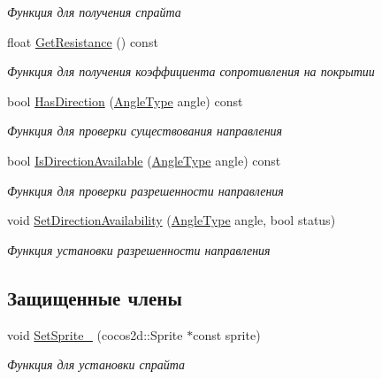 \begin{DoxyCompactItemize}
\begin{DoxyCompactList}\small\item\em Функция для получения спрайта \end{DoxyCompactList}\item 
float \hyperlink{classrtm_1_1_coating_object_a1680b004da834a1b885b4e22f09e84cc}{Get\+Resistance} () const
\begin{DoxyCompactList}\small\item\em Функция для получения коэффициента сопротивления на покрытии \end{DoxyCompactList}\item 
bool \hyperlink{classrtm_1_1_coating_object_a88eb5287d899ca8e10e31de4192bbddc}{Has\+Direction} (\hyperlink{namespacertm_a69dc82b16a0148c10962caa83d930f89}{Angle\+Type} angle) const
\begin{DoxyCompactList}\small\item\em Функция для проверки существования направления \end{DoxyCompactList}\item 
bool \hyperlink{classrtm_1_1_coating_object_a4d7656260eaa296f1bfa2e957698c437}{Is\+Direction\+Available} (\hyperlink{namespacertm_a69dc82b16a0148c10962caa83d930f89}{Angle\+Type} angle) const
\begin{DoxyCompactList}\small\item\em Функция для проверки разрешенности направления \end{DoxyCompactList}\item 
void \hyperlink{classrtm_1_1_coating_object_a93eb37a24af3939337f6330209fae809}{Set\+Direction\+Availability} (\hyperlink{namespacertm_a69dc82b16a0148c10962caa83d930f89}{Angle\+Type} angle, bool status)
\begin{DoxyCompactList}\small\item\em Функция установки разрешенности направления \end{DoxyCompactList}\end{DoxyCompactItemize}
\subsection*{Защищенные члены}
\begin{DoxyCompactItemize}
\item 
void \hyperlink{classrtm_1_1_coating_object_a1d0227cd023ce6e6bd475194b5cbfe2d}{Set\+Sprite\+\_\+} (cocos2d\+::\+Sprite $\ast$const sprite)
\begin{DoxyCompactList}\small\item\em Функция для установки спрайта \end{DoxyCompactList}\end{DoxyCompactItemize}
